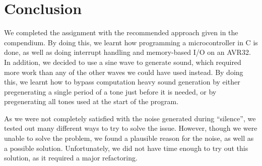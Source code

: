 \section{Conclusion}

We completed the assignment with the recommended approach given in the
compendium. By doing this, we learnt how programming a microcontroller
in C is done, as well as doing interrupt handling and memory-based I/O
on an AVR32. In addition, we decided to use a sine wave to generate
sound, which required more work than any of the other waves we could
have used instead. By doing this, we learnt how to bypass computation
heavy sound generation by either pregenerating a single period of a tone
just before it is needed, or by pregenerating all tones used at the
start of the program. 

As we were not completely satisfied with the noise generated during
``silence'', we tested out many different ways to try to solve the issue.
However, though we were unable to solve the problem, we found a plausible reason
for the noise, as well as a possible solution. Unfortunately, we did not
have time enough to try out this solution, as it required a major
refactoring.
